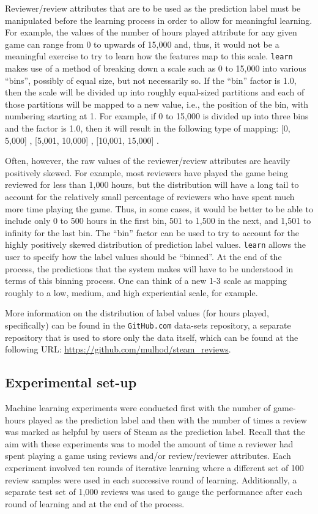 \documentclass[9pt]{article}
\begin{document}
Reviewer/review attributes that are to be used as the prediction label must be manipulated before the learning process in order to allow for meaningful learning. For example, the values of the number of hours played attribute for any given game can range from 0 to upwards of 15,000 and, thus, it would not be a meaningful exercise to try to learn how the features map to this scale. {\tt learn} makes use of a method of breaking down a scale such as 0 to 15,000 into various ``bins'', possibly of equal size, but not necessarily so. If the ``bin'' factor is 1.0, then the scale will be divided up into roughly equal-sized partitions and each of those partitions will be mapped to a new value, i.e., the position of the bin, with numbering starting at 1. For example, if 0 to 15,000 is divided up into three bins and the factor is 1.0, then it will result in the following type of mapping: [0, 5,000] , [5,001, 10,000] , [10,001, 15,000] .

Often, however, the raw values of the reviewer/review attributes are heavily positively skewed. For example, most reviewers have played the game being reviewed for less than 1,000 hours, but the distribution will have a long tail to account for the relatively small percentage of reviewers who have spent much more time playing the game. Thus, in some cases, it would be better to be able to include only 0 to 500 hours in the first bin, 501 to 1,500 in the next, and 1,501 to infinity for the last bin. The ``bin'' factor can be used to try to account for the highly positively skewed distribution of prediction label values. {\tt learn} allows the user to specify how the label values should be ``binned''. At the end of the process, the predictions that the system makes will have to be understood in terms of this binning process. One can think of a new 1-3 scale as mapping roughly to a low, medium, and high experiential scale, for example.

More information on the distribution of label values (for hours played, specifically) can be found in the {\tt GitHub.com} data-sets repository, a separate repository that is used to store only the data itself, which can be found at the following URL: \url{https://github.com/mulhod/steam_reviews}.

\subsection{Experimental set-up}
\label{ssec:experimental_setup}

Machine learning experiments were conducted first with the number of game-hours played as the prediction label and then with the number of times a review was marked as helpful by users of Steam as the prediction label. Recall that the aim with these experiments was to model the amount of time a reviewer had spent playing a game using reviews and/or review/reviewer attributes. Each experiment involved ten rounds of iterative learning where a different set of 100 review samples were used in each successive round of learning. Additionally, a separate test set of 1,000 reviews was used to gauge the performance after each round of learning and at the end of the process.
\end{document}
